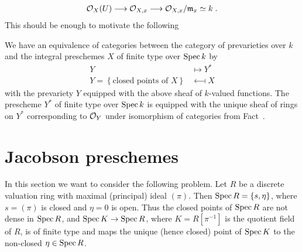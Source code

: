 \documentclass[a4paper,parskip=half,numbers=enddot, DIV=12]{scrreprt}
\begin{document}
\begin{align*}
    \Oo_X(U)\morphism \Oo_{X,x} \morphism \Oo_{X,x}/\mm_x \simeq k\;.
\end{align*}
This should be enough to motivate the following
\begin{thm}
    We have an equivalence of categories between the category of prevarieties over $k$ and the integral preschemes $X$ of finite type over $\operatorname{Spec} k$ by
    \begin{align*}
        Y &\longmapsto Y^*\\
        Y = \left\{\text{closed points of } X\right\} &\longmapsfrom X
    \end{align*}
    with the prevariety $Y$ equipped with the above sheaf of $k$-valued functions. The prescheme $Y^*$ of finite type over $\operatorname{Spec} k$ is equipped with the unique sheaf of rings on $Y^*$ corresponding to $\mathcal{O}_Y$ under isomorphism of categories from Fact~.
\end{thm}
\section{Jacobson preschemes}

In this section we want to consider the following problem. Let $R$ be a discrete valuation ring with maximal (principal) ideal $(\pi)$. Then $\operatorname{Spec} R = \{s,\eta\}$, where $s= (\pi)$ is closed and $\eta = 0$ is open. Thus the closed points of $\operatorname{Spec} R$ are not dense in $\operatorname{Spec} R$, and $\Spec K \morphism \Spec R$, where $K= R[\pi^{-1}]$ is the quotient field of $R$, is of finite type and maps the unique (hence closed) point of $\operatorname{Spec} K$ to the non-closed $\eta\in \operatorname{Spec} R$.
\end{document}
